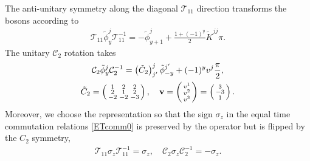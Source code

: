 The anti-unitary \AFTR symmetry along the diagonal $\mathcal{T}_{11}$ direction transforms the bosons according to \begin{align}\mathcal{T}_{11}\tilde\phi^j_y\mathcal{T}_{11}^{-1}=-\tilde\phi^j_{y+1}+\frac{1+(-1)^y}{2}\tilde{K}^{jj}\pi.\label{bosonTR11}\end{align} The unitary $\mathcal{C}_2$ rotation takes \begin{gather}\mathcal{C}_2\tilde\phi^j_y\mathcal{C}_2^{-1}=\left(\tilde{C}_2\right)^j_{j'}\tilde\phi^{j'}_{-y}+(-1)^yv^j\frac{\pi}{2},\label{bosonC2}\\\tilde{C}_2=\left(\begin{smallmatrix}1&2&2\\2&1&2\\-2&-2&-3\end{smallmatrix}\right),\quad{\bf v}=\left(\begin{smallmatrix}v^1\\v^2\\v^3\end{smallmatrix}\right)=\left(\begin{smallmatrix}3\\-3\\1\end{smallmatrix}\right).\nonumber\end{gather} Moreover, we choose the representation so that the sign $\sigma_z$ in the equal time commutation relations \eqref{ETcomm0} is preserved by the \AFTR operator but is flipped by the $C_2$ symmetry, \begin{align}\mathcal{T}_{11}\sigma_z\mathcal{T}_{11}^{-1}=\sigma_z,\quad\mathcal{C}_2\sigma_z\mathcal{C}_2^{-1}=-\sigma_z.\end{align} 

